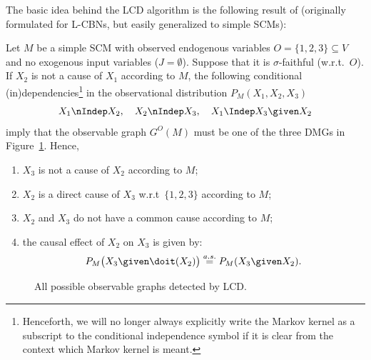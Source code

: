 The basic idea behind the LCD algorithm is the following result of \cite{Cooper1997}
(originally formulated for L-CBNs, but easily generalized to simple SCMs):
\begin{Prp}\label{prp:LCD}
  Let $M$ be a simple SCM with observed endogenous variables $O = \{1,2,3\} \subseteq V$ and no exogenous input variables ($J = \emptyset$).
  Suppose that it is $\sigma$-faithful (w.r.t.\ $O$). 
  If $X_2$ is not a cause of $X_1$ according to $M$,
  the following conditional (in)dependencies\footnote{Henceforth, we will no longer always explicitly write
  the Markov kernel as a subscript to the conditional independence symbol if it is clear
  from the context which Markov kernel is meant.} in the observational distribution $P_{M}(X_1,X_2,X_3)$
  $$X_1 \nIndep X_2, \quad X_2 \nIndep X_3, \quad X_1 \Indep X_3 \given X_2$$
  imply that the observable graph $G^O(M)$ must be one of the three DMGs in Figure~\ref{fig:LCD}. 
  Hence,
  \begin{enumerate}
  \item $X_3$ is not a cause of $X_2$ according to $M$;
  \item $X_2$ is a direct cause of $X_3$ w.r.t\ $\{1,2,3\}$ according to $M$;
  \item $X_2$ and $X_3$ do not have a common cause according to $M$;
  \item the causal effect of $X_2$ on $X_3$ is given by:
    \begin{equation}\label{eq:LCD}
      P_{M}\big(X_3 \given \doit(X_2)\big) \stackrel{a.s.}{=} P_{M}(X_3 \given X_2).
    \end{equation}
  \end{enumerate}
\end{Prp}
\begin{figure}
  \centering
  \caption{All possible observable graphs detected by LCD.\label{fig:LCD}}
\end{figure}
